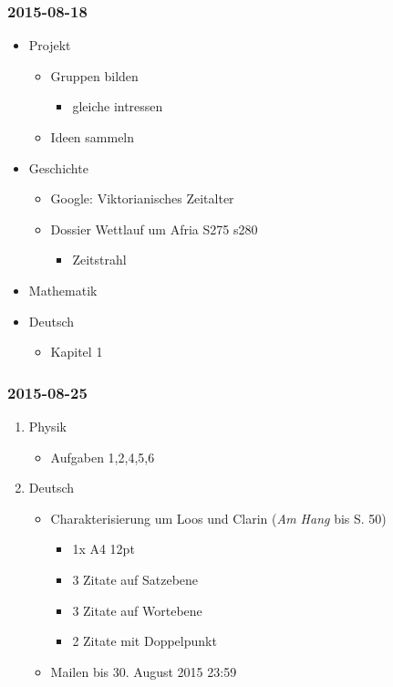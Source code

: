\documentclass[11pt]{article}
\begin{document}
\subsubsection{2015-08-18}
\label{sec-1-1-2}
\begin{itemize}
\item Projekt
\begin{itemize}
\item Gruppen bilden
\begin{itemize}
\item gleiche intressen
\end{itemize}
\item Ideen sammeln
\end{itemize}
\item Geschichte
\begin{itemize}
\item Google: Viktorianisches Zeitalter
\item Dossier Wettlauf um Afria S275 s280
\begin{itemize}
\item Zeitstrahl
\end{itemize}
\end{itemize}
\item Mathematik
\item Deutsch
\begin{itemize}
\item Kapitel 1
\end{itemize}
\end{itemize}
\subsubsection{2015-08-25}
\label{sec-1-1-3}
\begin{enumerate}
\item Physik
\label{sec-1-1-3-1}
\begin{itemize}
\item Aufgaben 1,2,4,5,6
\end{itemize}
\item Deutsch
\label{sec-1-1-3-2}
\begin{itemize}
\item Charakterisierung um Loos und Clarin (\emph{Am Hang} bis S. 50) 
\begin{itemize}
\item 1x A4 12pt
\item 3 Zitate auf Satzebene
\item 3 Zitate auf Wortebene
\item 2 Zitate mit Doppelpunkt
\end{itemize}
\item Mailen bis 30. August 2015 23:59
\end{itemize}
\end{enumerate}
\end{document}
